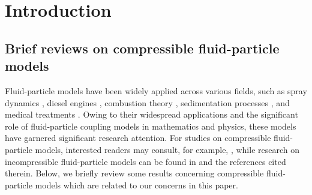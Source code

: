 \documentclass[reqno,11pt]{amsart}
\theoremstyle{plain}
\numberwithin{equation}{section}
\begin{document}
\tableofcontents

 
\setcounter{equation}{0}
 \indent

\section{Introduction}
 
 
 

\subsection{Brief reviews on  compressible fluid-particle models}
Fluid-particle models have been widely applied across various fields, 
such as spray dynamics \cite{BBBDLLT-irma-2005}, diesel engines \cite{RM-1952,RM-1952-a}, 
combustion theory \cite{Wfa-1958,Wfa-1985}, sedimentation processes \cite{BWC-zamm-2000}, 
and medical treatments \cite{BBJM-esaim-2005}.
Owing to their widespread applications and the  significant role of 
fluid-particle coupling models in   mathematics and physics, these 
models have garnered significant research attention. For studies on
 compressible fluid-particle models,  interested   readers  may consult,
  for example, \cite{CKL-JHDE-2013,CJ-MMMAS-2021,LMW-SIAM-2017,LNW-arXiv-2025,
  LWW-ARMA-2022,MV-CMP-2008,Ww-CMS-2024,LNW-1}, while research on incompressible 
  fluid-particle models can be found in \cite{CDM-krm-2011,GHMZ-siamj-2009,LNW-SAPM-2025, LNX-arXiv,
  LLY22,Wang-Yu2015,Yc-JMPA-2013,LNSW-arxiv} and the references cited therein. Below, we briefly
 review some results concerning compressible fluid-particle models which are related to our 
concerns in this paper.
\end{document}
